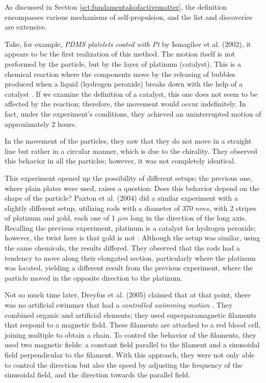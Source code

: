 As discussed in Section \ref{sct:fundamentalsofactivematter}, the definition encompasses various mechanisms of self-propulsion, and the list and discoveries are extensive.

Take, for example, \textit{PDMS platelets coated with Pt} by Ismagilov et al. (2002), it appears to be the first realization of this method. The motion itself is not performed by the particle, but by the layer of platinum (catalyst). This is a chemical reaction where the components move by the releasing of bubbles produced when a liquid (hydrogen peroxide) breaks down with the help of a catalyst \cite{ismagilov2002autonomous}. If we examine the definition of a catalyst, this one does not seem to be affected by the reaction; therefore, the movement would occur indefinitely. In fact, under the experiment's conditions, they achieved an uninterrupted motion of approximately 2 hours. 

In the movement of the particles, they saw that they do not move in a straight line but rather in a circular manner, which is due to the chirality. They observed this behavior in all the particles; however, it was not completely identical.  


This experiment opened up the possibility of different setups; the previous one, where plain plates were used, raises a question: Does this behavior depend on the shape of the particle? Paxton et al. (2004) did a similar experiment with a slightly different setup, utilizing rods with a diameter of  370 $nms$, with 2 stripes of platinum and gold, each one of 1 $\mu m$ long in the direction of the long axis. Recalling the previous experiment, platinum is a catalyst for hydrogen peroxide; however, the twist here is that gold is not \cite{paxton2004catalytic}. Although the setup was similar, using the same chemicals, the results differed. They observed that the rods had a tendency to move along their elongated section, particularly where the platinum was located, yielding a different result from the previous experiment, where the particle moved in the opposite direction to the platinum.

Not so much time later, Dreyfus et al. (2005) claimed that at that point, there was no artificial swimmer that had a \textit{controlled swimming motion} \cite{dreyfus2005microscopic}. They combined organic and artificial elements; they used superparamagnetic filaments that respond to a magnetic field. These filaments are attached to a red blood cell, joining multiple to obtain a chain. To control the behavior of the filaments, they used two magnetic fields: a constant field parallel to the filament and a sinusoidal field perpendicular to the filament. With this approach, they were not only able to control the direction but also the speed by adjusting the frequency of the sinusoidal field, and the direction towards the parallel field.

